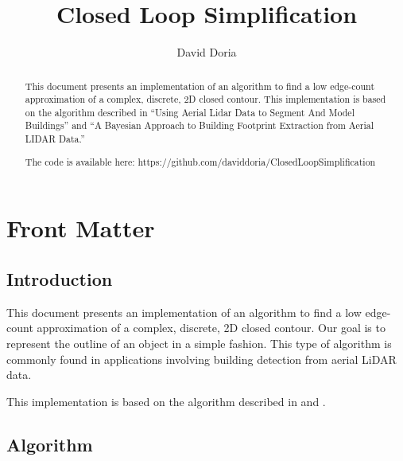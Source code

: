 \documentclass{InsightArticle}
\title{Closed Loop Simplification}
\author{David Doria}
\newcommand{\IJhandlerIDnumber}{3250}
\begin{document}
\IJhandlefooter{\IJhandlerIDnumber}


\ifpdf
\else
\fi


\maketitle


\ifhtml
\chapter*{Front Matter\label{front}}
\fi

\begin{abstract}
\noindent

This document presents an implementation of an algorithm to find a low edge-count approximation of a complex, discrete, 2D closed contour. This implementation is based on the algorithm described in ``Using Aerial Lidar Data to Segment And Model Buildings'' and ``A Bayesian Approach to Building Footprint Extraction from Aerial LIDAR Data.''

The code is available here:
https://github.com/daviddoria/ClosedLoopSimplification

\end{abstract}

\IJhandlenote{\IJhandlerIDnumber}

\tableofcontents
\section{Introduction}
This document presents an implementation of an algorithm to find a low edge-count approximation of a complex, discrete, 2D closed contour. Our goal is to represent the outline of an object in a simple fashion. This type of algorithm is commonly found in applications involving building detection from aerial LiDAR data.

This implementation is based on the algorithm described in \cite{WangThesis} and \cite{WangPaper}.

\section{Algorithm}
\label{sec:Algorithm}
\end{document}
